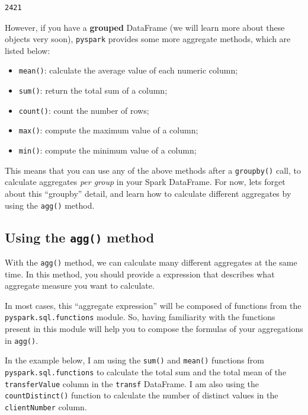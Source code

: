 \documentclass[
  11pt,
  letterpaper,
  DIV=11,
  numbers=noendperiod]{scrreprt}
\providecommand{\tightlist}{%
  \setlength{\itemsep}{0pt}\setlength{\parskip}{0pt}}\usepackage{longtable,booktabs,array}
\begin{document}
\begin{verbatim}
2421
\end{verbatim}

However, if you have a \textbf{grouped} DataFrame (we will learn more
about these objects very soon), \texttt{pyspark} provides some more
aggregate methods, which are listed below:

\begin{itemize}
\tightlist
\item
  \texttt{mean()}: calculate the average value of each numeric column;
\item
  \texttt{sum()}: return the total sum of a column;
\item
  \texttt{count()}: count the number of rows;
\item
  \texttt{max()}: compute the maximum value of a column;
\item
  \texttt{min()}: compute the minimum value of a column;
\end{itemize}

This means that you can use any of the above methods after a
\texttt{groupby()} call, to calculate aggregates \emph{per group} in
your Spark DataFrame. For now, lets forget about this ``groupby''
detail, and learn how to calculate different aggregates by using the
\texttt{agg()} method.

\hypertarget{sec-agg-method}{%
\subsection{\texorpdfstring{Using the \texttt{agg()}
method}{Using the agg() method}}\label{sec-agg-method}}

With the \texttt{agg()} method, we can calculate many different
aggregates at the same time. In this method, you should provide a
expression that describes what aggregate measure you want to calculate.

In most cases, this ``aggregate expression'' will be composed of
functions from the \texttt{pyspark.sql.functions} module. So, having
familiarity with the functions present in this module will help you to
compose the formulas of your aggregations in \texttt{agg()}.

In the example below, I am using the \texttt{sum()} and \texttt{mean()}
functions from \texttt{pyspark.sql.functions} to calculate the total sum
and the total mean of the \texttt{transferValue} column in the
\texttt{transf} DataFrame. I am also using the \texttt{countDistinct()}
function to calculate the number of distinct values in the
\texttt{clientNumber} column.
\end{document}

